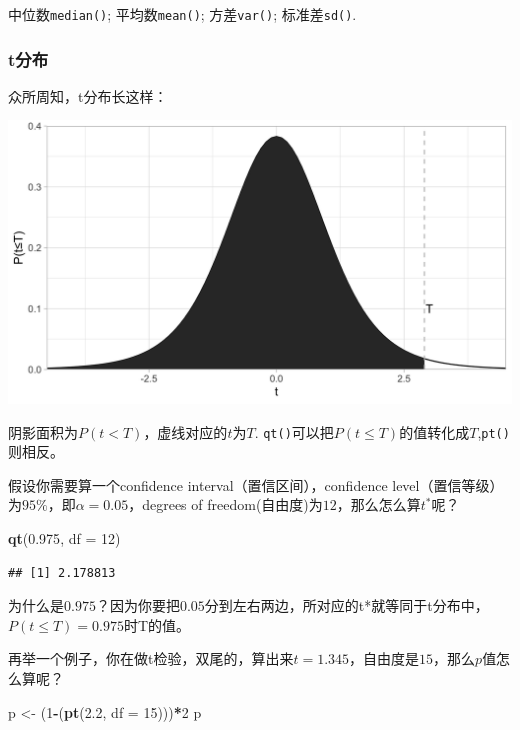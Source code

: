 \documentclass[]{book}
\newenvironment{Shaded}{\begin{snugshade}}{\end{snugshade}}
\newcommand{\DataTypeTok}[1]{\textcolor[rgb]{0.13,0.29,0.53}{#1}}
\newcommand{\DecValTok}[1]{\textcolor[rgb]{0.00,0.00,0.81}{#1}}
\newcommand{\FloatTok}[1]{\textcolor[rgb]{0.00,0.00,0.81}{#1}}
\newcommand{\KeywordTok}[1]{\textcolor[rgb]{0.13,0.29,0.53}{\textbf{#1}}}
\newcommand{\NormalTok}[1]{#1}
\newcommand{\OperatorTok}[1]{\textcolor[rgb]{0.81,0.36,0.00}{\textbf{#1}}}
\newcommand{\StringTok}[1]{\textcolor[rgb]{0.31,0.60,0.02}{#1}}
\begin{document}
中位数\texttt{median()}; 平均数\texttt{mean()}; 方差\texttt{var()}; 标准差\texttt{sd()}.

\hypertarget{t-dist}{%
\subsubsection{t分布}\label{t-dist}}

众所周知，t分布长这样：

\includegraphics[width=1\linewidth]{img/graphics/t-distribution}

阴影面积为\(P(t<T)\)，虚线对应的\(t\)为\(T\).
\texttt{qt()}可以把\(P(t≤T)\)的值转化成\(T\),\texttt{pt()}则相反。

假设你需要算一个confidence interval（置信区间），confidence level（置信等级）为\(95\%\)，即\(\alpha=0.05\)，degrees of freedom(自由度)为\(12\)，那么怎么算\(t^*\)呢？

\begin{Shaded}
\begin{Highlighting}[]
\KeywordTok{qt}\NormalTok{(}\FloatTok{0.975}\NormalTok{, }\DataTypeTok{df =} \DecValTok{12}\NormalTok{)}
\end{Highlighting}
\end{Shaded}

\begin{verbatim}
## [1] 2.178813
\end{verbatim}

为什么是\(0.975\)？因为你要把\(0.05\)分到左右两边，所对应的t*就等同于t分布中，\(P(t ≤ T) = 0.975\)时T的值。

再举一个例子，你在做t检验，双尾的，算出来\(t=1.345\)，自由度是\(15\)，那么\(p\)值怎么算呢？

\begin{Shaded}
\begin{Highlighting}[]
\NormalTok{p <-}\StringTok{ }\NormalTok{(}\DecValTok{1}\OperatorTok{-}\NormalTok{(}\KeywordTok{pt}\NormalTok{(}\FloatTok{2.2}\NormalTok{, }\DataTypeTok{df =} \DecValTok{15}\NormalTok{)))}\OperatorTok{*}\DecValTok{2}
\NormalTok{p}
\end{Highlighting}
\end{Shaded}
\end{document}
